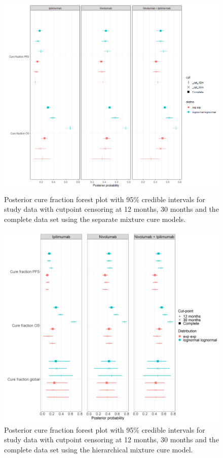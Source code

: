 \documentclass[AMA,STIX1COL]{WileyNJD-v2}
\begin{document}
\begin{figure}[!ht]
\centering
\includegraphics[height=10cm, width=0.6\linewidth]{forest_plot_cf_sep_cpt.png}
\caption{\label{fig:forest_plot_cf_cutpoint_sep} Posterior cure fraction forest plot with 95\% credible intervals for study data with cutpoint censoring at 12 months, 30 months and the complete data set using the separate mixture cure models.}
\end{figure}

\begin{figure}[!ht]
\centering
\includegraphics[height=10cm, width=0.6\linewidth]{forest_plot_cf_hier_cpt.png}
\caption{\label{fig:forest_plot_cf_cutpoint_hier} Posterior cure fraction forest plot with 95\% credible intervals for study data with cutpoint censoring at 12 months, 30 months and the complete data set using the hierarchical mixture cure model.}
\end{figure}
\end{document}
